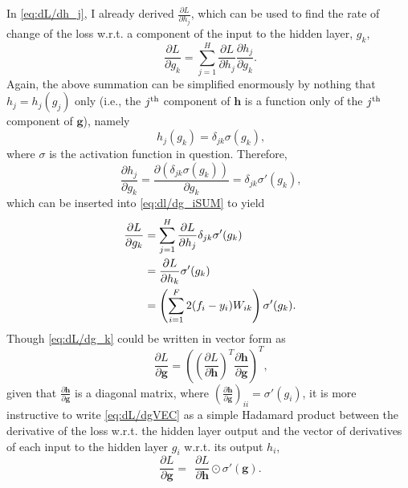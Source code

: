\documentclass{article}
\begin{document}
In \cref{eq:dL/dh_j}, I already derived $\frac{\partial L}{\partial h_j}$, which can be used to find the rate of change of the loss w.r.t. a component of the input to the hidden layer, $g_k$,
\begin{equation}
\label{eq:dl/dg_iSUM}
    \phantom{.}\frac{\partial L}{\partial g_k} = \displaystyle\sum_{j=1}^H\frac{\partial L}{\partial h_j}\frac{\partial h_j}{\partial g_k}.
\end{equation}
Again, the above summation can be simplified enormously by nothing that $h_j = h_j(g_j)$ only (i.e., the $j\textsuperscript{th}$ component of $\mathbf{h}$ is a function only of the $j\textsuperscript{th}$ component of $\mathbf{g}$), namely
\begin{equation}
    \phantom{,}h_j(g_k) = \delta_{jk}\sigma(g_k),
\end{equation}
where $\sigma$ is the activation function in question. Therefore,
\begin{equation}
    \phantom{,}\frac{\partial h_j}{\partial g_k} = \frac{\partial (\delta_{jk}\sigma(g_k))}{\partial g_k} = \delta_{jk}\sigma'(g_k),
\end{equation}
which can be inserted into \cref{eq:dl/dg_iSUM} to yield
\begin{align}
\label{eq:dL/dg_k}
    \phantom{.}\frac{\partial L}{\partial g_k} &= \displaystyle\sum_{j=1}^H\frac{\partial L}{\partial h_j}\delta_{jk}\sigma'(g_k)\notag\\
    &= \frac{\partial L}{\partial h_k}\sigma'(g_k) \\
    &= \left(\displaystyle\sum_{i=1}^F 2(f_i - y_i)W_{ik}\right)\sigma'(g_k).
\end{align}
Though \cref{eq:dL/dg_k} could be written in vector form as
\begin{equation}
\label{eq:dL/dgVEC}
    \phantom{,}\frac{\partial L}{\partial \mathbf{g}} = \left(\left(\frac{\partial L}{\partial \mathbf{h}}\right)^T\frac{\partial \mathbf{h}}{\partial \mathbf{g}}\right)^T,
\end{equation}
given that $\frac{\partial \mathbf{h}}{\partial \mathbf{g}}$ is a diagonal matrix, where $\left(\frac{\partial \mathbf{h}}{\partial \mathbf{g}}\right)_{ii} = \sigma'(g_i)$, it is more instructive to write \cref{eq:dL/dgVEC} as a simple Hadamard product between the derivative of the loss w.r.t. the hidden layer output and the vector of derivatives of each input to the hidden layer $g_i$ w.r.t. its output $h_i$,
\begin{equation}
\label{eq:dL/dg_hadamard}
    \phantom{.}\frac{\partial L}{\partial \mathbf{g}} = \phantom{,}\frac{\partial L}{\partial \mathbf{h}} \odot \sigma'(\mathbf{g}).
\end{equation}
\end{document}
